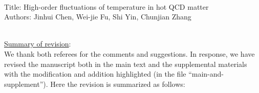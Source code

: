 \documentclass[aps,article,author-year,notitlepage,showpacs]{revtex4-2}
\begin{document}
\large

\\

\noindent Title: High-order fluctuations of temperature in hot QCD matter\\

\noindent Authors: Jinhui Chen, Wei-jie Fu, Shi Yin, Chunjian Zhang\\[3ex] 




\noindent \underline{Summary of revision}:\\

\noindent  We thank both referees for the comments and suggestions. In response, we have revised the manuscript both in the main text and the supplemental materials with the modification and addition highlighted (in the file ``main-and-supplement''). Here the revision is summarized as follows:\\[-1.5ex] 
\end{document}
